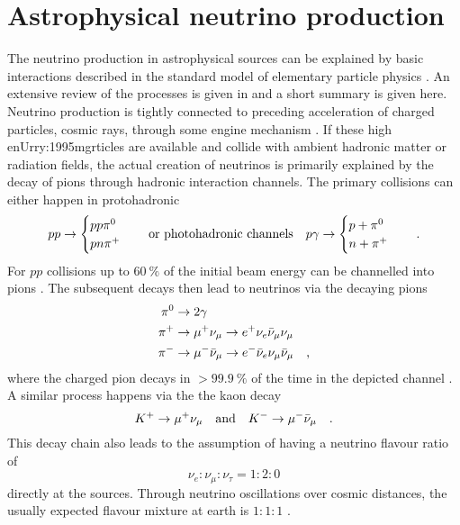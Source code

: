 \section{Astrophysical neutrino production}
  \label{chp:astro_nu_production}
The neutrino production in astrophysical sources can be explained by basic interactions described in the standard model of elementary particle physics \cite{Patrignani:2016xqp,Herrero:1998eq}.
An extensive review of the processes is given in \cite{Gaisser:1990vg,Gaisser:2016uoy,Grupen:2005rx} and a short summary is given here.
Neutrino production is tightly connected to preceding acceleration \cite{FermiShockAcc} of charged particles, cosmic rays, through some engine mechanism \cite{NetzerAGNReview,Beckmann:2013wte,Urry:1995mg}.
If these high enUrry:1995mgrticles are available and collide with ambient hadronic matter or radiation fields, the actual creation of neutrinos is primarily explained by the decay of pions through hadronic interaction channels.
The primary collisions can either happen in protohadronic
\begin{equation}
  p p \rightarrow
    \begin{cases}
      p p \pi^0 \\
      p n \pi^+
    \end{cases}
    \quad\text{or photohadronic channels}\quad
  p \gamma \rightarrow
    \begin{cases}
      p + \pi^0 \\
      n + \pi^+
    \end{cases}
  \quad\text{.}
\end{equation}
For $pp$ collisions up to $\SI{60}{\percent}$ of the initial beam energy can be channelled into pions \cite{Frichter:1997wh}.
The subsequent decays then lead to neutrinos via the decaying pions
\begin{align}
  \pi^0 &\rightarrow 2\gamma \\
  \pi^+ &\rightarrow \mu^+ \nu_\mu
         \rightarrow e^+ \nu_e \bar{\nu}_\mu \nu_\mu \\
  \pi^- &\rightarrow \mu^- \bar{\nu}_\mu
         \rightarrow e^- \bar{\nu}_e \nu_\mu \bar{\nu}_\mu
  \quad\text{,}
\end{align}
where the charged pion decays in $>\SI{99,9}{\percent}$ of the time in the depicted channel \cite{Patrignani:2016xqp}.
A similar process happens via the the kaon decay \cite{GAISSER2012801}
\begin{equation}
  K^+ \rightarrow \mu^+ \nu_\mu
  \quad\text{and}\quad
  K^- \rightarrow \mu^- \bar{\nu}_\mu
  \quad\text{.}
\end{equation}
This decay chain also leads to the assumption of having a neutrino flavour ratio of
\begin{equation}
  \nu_e : \nu_\mu : \nu_\tau = 1 : 2 : 0
\end{equation}
directly at the sources.
Through neutrino oscillations over cosmic distances, the usually expected flavour mixture at earth is $1:1:1$ \cite{Athar:2005wg,Athar:2000yw}.

